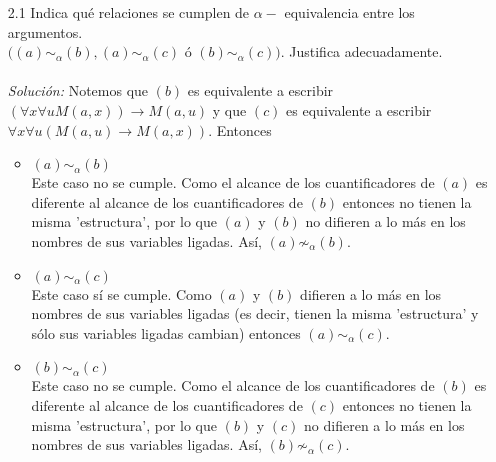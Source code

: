 \documentclass[letterpaper,11pt]{article}
\begin{document}
\begin{enumerate}
\begin{itemize}
            \begin{enumerate}
                \item[2.1] Indica qué relaciones se cumplen de $\alpha-$
                equivalencia entre los argumentos. \\
                $((a) \sim_{\alpha} (b), (a) \sim_{\alpha} (c)$ ó 
                $(b) \sim_{\alpha} (c))$. Justifica adecuadamente. \\ \\
                \textit{Solución:} Notemos que $(b)$ es equivalente a escribir 
                $(\forall x \forall u M(a,x)) \rightarrow M(a,u)$ y que $(c)$
                es equivalente a escribir $\forall x \forall u (M(a,u) 
                \rightarrow M(a,x))$. Entonces
                \begin{itemize}
                    \item $(a) \sim_{\alpha} (b)$ \\
                    Este caso no se cumple. Como el alcance de los 
                    cuantificadores de $(a)$ es diferente al alcance de los
                    cuantificadores de $(b)$ entonces no tienen la misma 
                    'estructura', por lo que $(a)$ y $(b)$ no difieren a lo
                    más en los nombres de sus variables ligadas. Así, 
                    $(a) \not \sim_{\alpha} (b)$.

                    \item $(a) \sim_{\alpha} (c)$ \\
                    Este caso sí se cumple. Como $(a)$ y $(b)$ difieren a lo 
                    más en los nombres de sus variables ligadas (es decir,
                    tienen la misma 'estructura' y sólo sus variables 
                    ligadas cambian) entonces $(a) \sim_{\alpha} (c)$.

                    \item $(b) \sim_{\alpha} (c)$ \\
                    Este caso no se cumple.  Como el alcance de los 
                    cuantificadores de $(b)$ es diferente al alcance de los
                    cuantificadores de $(c)$ entonces no tienen la misma 
                    'estructura', por lo que $(b)$ y $(c)$ no difieren a lo
                    más en los nombres de sus variables ligadas. Así, 
                    $(b) \not \sim_{\alpha} (c)$.
                \end{itemize}


\end{enumerate}
\end{itemize}
\end{enumerate}
\end{document}
